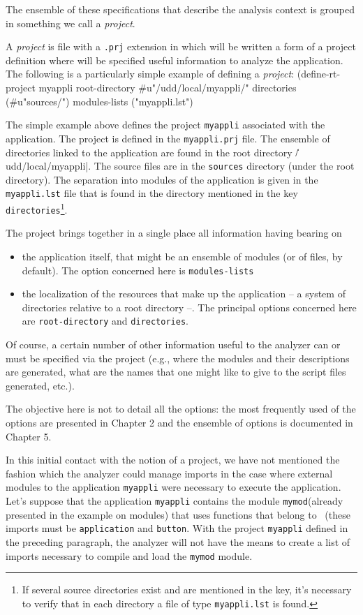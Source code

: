 The ensemble of these specifications that describe the analysis context is grouped in something we call a {\em project}.

A {\em project} is file with a {\tt .prj} extension in which will be written a form of a project definition where will be specified useful information to analyze the application.  The following is a particularly simple example of defining a {\em project}:
\BeginLL
(define-rt-project myappli
   root-directory #u"/udd/local/myappli/" 
   directories (#u"sources/")
   modules-lists ("myappli.lst") 
\EndLL

The simple example above defines the project {\tt myappli} associated with the application.  The project is defined in the {\tt myappli.prj} file.  The ensemble of directories linked to the application are found in the root directory \|/udd/local/myappli|.  The source files are in the {\tt sources} directory (under the root directory).  The separation into modules of the application is given in the {\tt myappli.lst} file that is found in the directory mentioned in the key {\tt directories}\footnote{If several source directories exist and are mentioned in the key, it's necessary to verify that in each directory a file of type {\tt myappli.lst} is found.}. 

The project brings together in a single place all information having bearing on 
\begin{itemize}
\item the application itself, that might be an ensemble of modules (or of files, by default).  The option concerned here is {\tt modules-lists}
\item the localization of the resources that make up the application -- a system of directories relative to a root directory --.  The principal options concerned here are {\tt root-directory}
and {\tt directories}.
\end{itemize}

Of course, a certain number of other information useful to the analyzer can or must be specified via the project (e.g., where the modules and their descriptions are generated, what are the names that one might like to give to the script files generated, etc.).

The objective here is not to detail all the options:  the most frequently used of the options are presented in Chapter 2 and the ensemble of options is documented in Chapter 5.


In this initial contact with the notion of a project, we have not mentioned the fashion which the analyzer could manage imports in the case where external modules to the application {\tt myappli} were necessary to execute the application. 
Let's suppose that the application {\tt myappli} contains the module {\tt mymod}(already presented in the example on modules) that uses functions that belong to \Aida\ (these imports must be {\tt application} and {\tt button}. 
With the project {\tt myappli} defined in the preceding paragraph, the analyzer will not have the means to create a list of imports necessary to compile and load the {\tt mymod} module.

